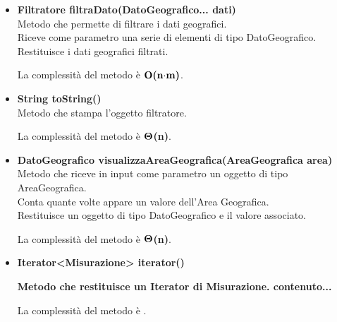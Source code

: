 \documentclass[a4paper, 12pt]{scrreprt}
\begin{document}
\begin{itemize}
				La complessit\`a del metodo \`e $\bigO\textbf{(n$\cdot$m)}$.
				
				\item \textbf {Filtratore filtraDato(DatoGeografico... dati)}
				\\Metodo che permette di filtrare i dati geografici.
				\\Riceve come parametro una serie di elementi di tipo DatoGeografico.
				\\Restituisce i dati geografici filtrati.
				
				La complessit\`a del metodo \`e $\bigO\textbf{(n$\cdot$m)}$.
				
				\item \textbf {String toString()}
				\\Metodo che stampa l'oggetto filtratore.
				
				La complessit\`a del metodo \`e $\mathbf{\Theta}$\textbf{(n)}.
				
				\item \textbf{DatoGeografico visualizzaAreaGeografica(AreaGeografica area)}
				\\Metodo che riceve in input come parametro un oggetto di tipo AreaGeografica.
				\\Conta quante volte appare un valore dell'Area Geografica.
				\\Restituisce un oggetto di tipo DatoGeografico e il valore associato.
				
				La complessit\`a del metodo \`e $\mathbf{\Theta}$\textbf{(n)}.
				
				\item \textbf{Iterator<Misurazione> iterator()}
				
								
				\textbf{Metodo che restituisce un Iterator di Misurazione.	contenuto...}
				
				La complessit\`a del metodo \`e .
				
			\end{itemize}
\end{document}
